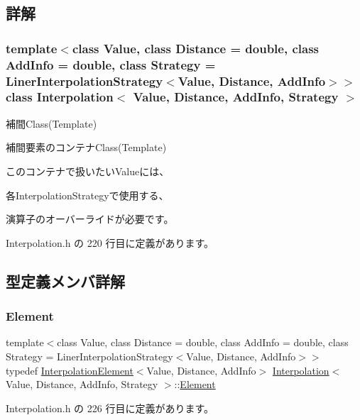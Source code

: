 \subsection{詳解}
\subsubsection*{template$<$class Value, class Distance = double, class Add\+Info = double, class Strategy = Liner\+Interpolation\+Strategy$<$\+Value, Distance, Add\+Info$>$$>$\newline
class Interpolation$<$ Value, Distance, Add\+Info, Strategy $>$}

補間\+Class(\+Template) 

補間要素のコンテナ\+Class(\+Template)

このコンテナで扱いたい\+Valueには、

各\+Interpolation\+Strategyで使用する、

演算子のオーバーライドが必要です。 

 Interpolation.\+h の 220 行目に定義があります。



\subsection{型定義メンバ詳解}
\mbox{\label{class_interpolation_a01e71544809483d7a2ee72fe0007bcb0}} 
\subsubsection{\texorpdfstring{Element}{Element}}
{\footnotesize\ttfamily template$<$class Value, class Distance = double, class Add\+Info = double, class Strategy = Liner\+Interpolation\+Strategy$<$\+Value, Distance, Add\+Info$>$$>$ \\
typedef \mbox{\hyperlink{class_interpolation_element}{Interpolation\+Element}}$<$Value, Distance, Add\+Info$>$ \mbox{\hyperlink{class_interpolation}{Interpolation}}$<$ Value, Distance, Add\+Info, Strategy $>$\+::\mbox{\hyperlink{class_interpolation_a01e71544809483d7a2ee72fe0007bcb0}{Element}}}



 Interpolation.\+h の 226 行目に定義があります。

\mbox{\label{class_interpolation_a066eb9906faf7f1d56ba68d00c6be64a}} 
